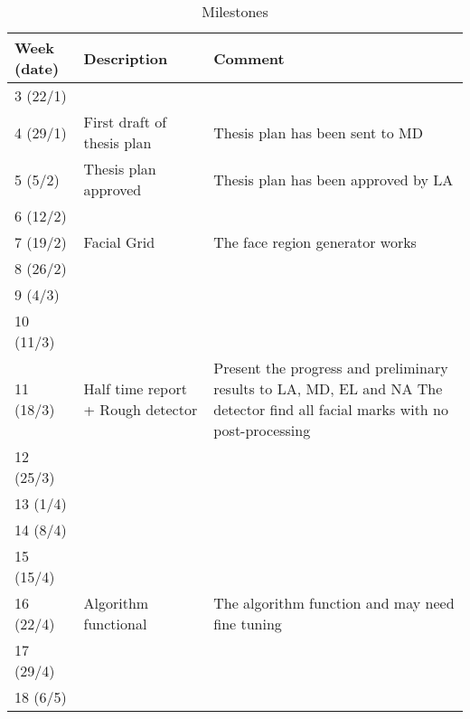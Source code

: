\begin{table}[H]
\caption{Milestones}
\label{table:milestones}
\begin{tabular}{|p{}|p{}|p{}|}
	\hline
	\textbf{Week (date)} & \textbf{Description}                  & \textbf{Comment}                                                  \\ \hline
	3 (22/1)             &                                       &  \\ \hline
	4 (29/1)             & First draft of thesis plan            & Thesis plan has been sent to MD                                   \\ \hline
	5 (5/2)              & Thesis plan approved                  & Thesis plan has been approved by LA                               \\ \hline
	6 (12/2)             &                                       &  \\ \hline
	7 (19/2)             & Facial Grid                           & The face region generator works  \\ \hline
	8 (26/2)             &                                       &  \\ \hline
	9 (4/3)              &                                       &  \\ \hline
	10 (11/3)            &                                       &  \\ \hline
	11 (18/3)            & Half time report + Rough detector     & Present the progress and preliminary results to LA, MD, EL and NA \newline The detector find all facial marks with no post-processing \\ \hline
	12 (25/3)            &                                       &  \\ \hline
	13 (1/4)             &                                       &  \\ \hline
	14 (8/4)             &                                       &  \\ \hline
	15 (15/4)            &                                       &  \\ \hline
	16 (22/4)            & Algorithm functional                  &  The algorithm function and may need fine tuning\\ \hline
	17 (29/4)            &                                       &  \\ \hline
	18 (6/5)             &                                       &  \\ \hline

\end{tabular}
\end{table}
